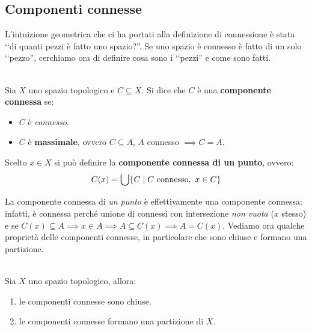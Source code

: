 \subsection{Componenti connesse}
L'intuizione geometrica che ci ha portati alla definizione di connessione è stata ‘‘di quanti pezzi è fatto uno spazio?''. Se uno spazio è connesso è fatto di un solo ‘‘pezzo'', cerchiamo ora di definire cosa sono i ‘‘pezzi'' e come sono fatti.
\begin{define}~{}\\
	Sia $X$ uno spazio topologico e $C\subseteq X$. Si dice che $C$ è una \textbf{componente connessa} se:
		\begin{itemize}
			\item $C$ è \textit{connesso}.
			\item $C$ è \textbf{massimale}, ovvero $C\subseteq A$, $A$ connesso $\implies C=A$.
		\end{itemize}
	Scelto $x\in X$ si può definire la \textbf{componente connessa di un punto}, ovvero:
	\begin{equation}
		\displaystyle C(x)=\mathop{{\bigcup}}\displaylimits \{C \mid C\text{ connesso},\ x\in C\}
	\end{equation}
\vspace{-6mm}
\end{define}
La componente connessa di \textit{un punto} è effettivamente una componente connessa: infatti, è connessa perché unione di connessi con intersezione \textit{non vuota} ($x$ stesso) e se $C(x)\subseteq A \implies x\in A \implies A\subseteq C(x) \implies A=C(x)$.\newline
Vediamo ora qualche proprietà delle componenti connesse, in particolare che sono chiuse e formano una partizione.
\begin{theorema}~{}\\
	Sia $X$ uno spazio topologico, allora:
		\begin{enumerate}
			\item le componenti connesse sono chiuse.
			\item le componenti connesse formano una partizione di $X$.
		\end{enumerate}
	\vspace{-3mm}
\end{theorema}
